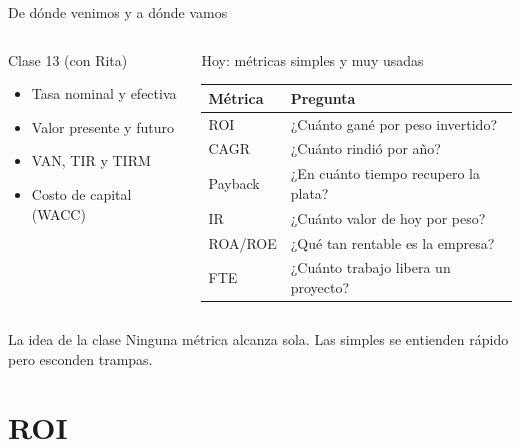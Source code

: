 \documentclass[aspectratio=169,10pt]{beamer}
\begin{document}
\begin{frame}{De dónde venimos y a dónde vamos}

\begin{columns}[T]
\begin{block}{Clase 13 (con Rita)}
\begin{itemize}
  \item Tasa nominal y efectiva
  \item Valor presente y futuro
  \item VAN, TIR y TIRM
  \item Costo de capital (WACC)
\end{itemize}
\end{block}

\begin{block}{Hoy: métricas simples y muy usadas}
\small
\begin{tabular}{ll}
\toprule
\textbf{Métrica} & \textbf{Pregunta} \\
\midrule
ROI     & ¿Cuánto gané por peso invertido? \\
CAGR    & ¿Cuánto rindió por año? \\
Payback & ¿En cuánto tiempo recupero la plata? \\
IR      & ¿Cuánto valor de hoy por peso? \\
ROA/ROE & ¿Qué tan rentable es la empresa? \\
FTE     & ¿Cuánto trabajo libera un proyecto? \\
\bottomrule
\end{tabular}
\end{block}
\end{columns}

\vspace{0.3cm}
\begin{alertblock}{La idea de la clase}
Ninguna métrica alcanza sola. Las simples se entienden rápido pero esconden trampas.
\end{alertblock}
\end{frame}

\section{ROI}
\end{document}
